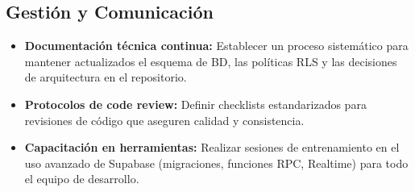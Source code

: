 \subsection{Gestión y Comunicación}

\begin{itemize}[leftmargin=1.5em]
  \item \textbf{Documentación técnica continua:} Establecer un proceso sistemático
        para mantener actualizados el esquema de BD, las políticas RLS y las
        decisiones de arquitectura en el repositorio.
  \item \textbf{Protocolos de code review:} Definir checklists estandarizados
        para revisiones de código que aseguren calidad y consistencia.
  \item \textbf{Capacitación en herramientas:} Realizar sesiones de entrenamiento
        en el uso avanzado de Supabase (migraciones, funciones RPC, Realtime)
        para todo el equipo de desarrollo.
\end{itemize}